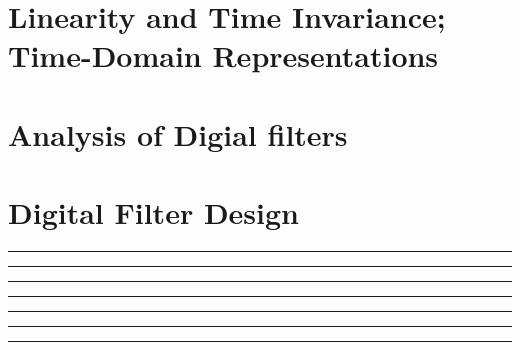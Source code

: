\documentclass[10pt]{article}
\begin{document}
\newcommand{\josquote}[1]{
    \framebox{
    \parbox{\textwidth}{
    \textit{#1}
    }
    }
}

\newcommand{\paulhint}[1]{
    #1
}

\setlength\parindent{0pt}
\section{Linearity and Time Invariance; Time-Domain Representations}
%
%
%
%
%
\section{Analysis of Digial filters}
%
%
%
%
%
\section{Digital Filter Design}

\noindent\rule[0.5ex]{\linewidth}{0.5pt}

\noindent\rule[0.5ex]{\linewidth}{0.5pt}

\noindent\rule[0.5ex]{\linewidth}{0.5pt}

\noindent\rule[0.5ex]{\linewidth}{0.5pt}

\noindent\rule[0.5ex]{\linewidth}{0.5pt}

\noindent\rule[0.5ex]{\linewidth}{0.5pt}

\noindent\rule[0.5ex]{\linewidth}{0.5pt}

\end{document}
